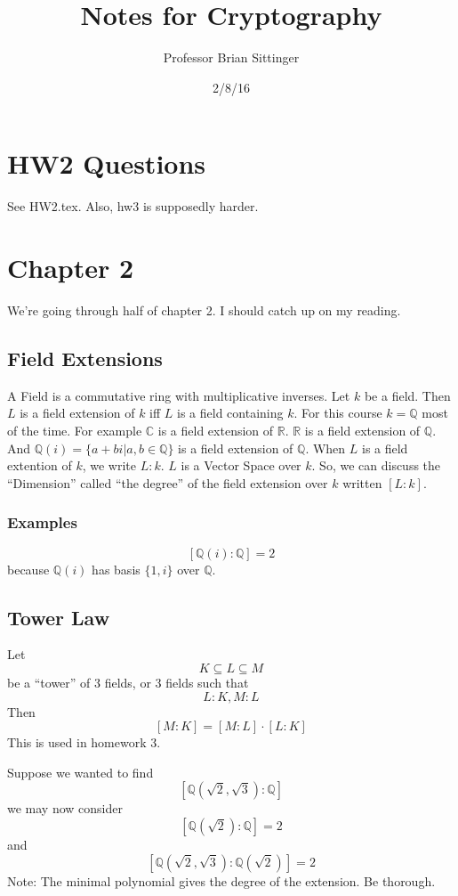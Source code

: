 \documentclass{article}
\title{Notes for Cryptography}
\author{Professor Brian Sittinger}
\date{2/8/16}
\begin{document}
\maketitle
\section{HW2 Questions}

See HW2.tex. Also, hw3 is supposedly harder.

\section{Chapter 2}
We're going through half of chapter 2. I should catch up on my reading. 
\subsection{Field Extensions}
A Field is a commutative ring with multiplicative inverses. Let $k$ be a field.
Then $L$ is a field extension of $k$ iff $L$ is a field containing $k$. For this
course $k = \mathbb{Q}$ most of the time. For example $\mathbb{C}$ is a field
extension of $\mathbb{R}$. $\mathbb{R}$ is a field extension of $\mathbb{Q}$.
And $\mathbb{Q}(i) = \{ a + bi | a,b \in \mathbb{Q} \}$ is a field extension of
$\mathbb{Q}$. When $L$ is a field extention of $k$, we write $L:k$. $L$ is a
Vector Space over $k$. So, we can discuss the ``Dimension'' called ``the
degree'' of the field extension over $k$ written $[L:k]$. 
\subsubsection{Examples}
\[ [\mathbb{Q}(i) : \mathbb{Q}] = 2 \]
because $\mathbb{Q}(i)$ has basis $\{1,i\}$ over $\mathbb{Q}$. 

\subsection{Tower Law}
Let 
\[ K \subseteq L \subseteq M \]
be a ``tower'' of 3 fields, or 3 fields such that
\[ L : K, M : L \]
Then
\[ [ M : K ] = [ M : L] \cdot [ L : K ] \]
This is used in homework 3. 

Suppose we wanted to find
\[ [ \mathbb{Q}(\sqrt{2}, \sqrt{3}) : \mathbb{Q} ] \]
we may now consider
\[ [ \mathbb{Q}(\sqrt{2}) : \mathbb{Q}] = 2\]
and 
\[ [ \mathbb{Q}(\sqrt{2},\sqrt{3}) : \mathbb{Q}(\sqrt{2}) ] = 2\]
Note: The minimal polynomial gives the degree of the extension. Be thorough. 
\end{document}
